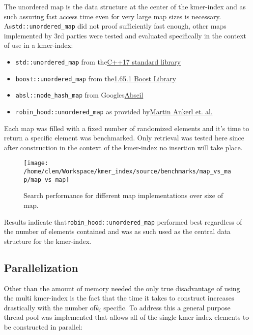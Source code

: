 The unordered map is the data structure at the center of the kmer-index
and as such assuring fast access time even for very large map sizes
is necessary. As\lstinline{std::unordered_map} did not proof sufficiently
fast enough, other maps implemented by 3rd parties were tested and
evaluated specifically in the context of use in a kmer-index:
\begin{itemize}
\item \lstinline{std::unordered_map} from the\href{https://en.cppreference.com/w/cpp/container/unordered_map}{C++17 standard library}
\item \lstinline{boost::unordered_map} from the\href{https://www.boost.org/doc/libs/1_65_0/doc/html/boost/unordered_map.html}{1.65.1 Boost Library}
\item \lstinline{absl::node_hash_map} from Googles\href{https://abseil.io/docs/cpp/guides/container\#abslnode_hash_map-and-abslnode_hash_set}{Abseil}
\item \lstinline{robin_hood::unordered_map} as provided by\href{https://github.com/martinus/robin-hood-hashing}{Martin Ankerl et. al.}
\end{itemize}
Each map was filled with a fixed number of randomized elements and
it's time to return a specific element was benchmarked. Only retrieval
was tested here since after construction in the context of the kmer-index
no insertion will take place.

\begin{figure}[H]
\texttt{[image: /home/clem/Workspace/kmer\_index/source/benchmarks/map\_vs\_map/map\_vs\_map]}

\caption{Search performance for different map implementations over size of
map.}
\end{figure}

Results indicate that\lstinline{robin_hood::unordered_map} performed
best regardless of the number of elements contained and was as such
used as the central data structure for the kmer-index.

\subsection{Parallelization}

Other than the amount of memory needed the only true disadvantage
of using the multi kmer-index is the fact that the time it takes to
construct increases drastically with the number of$k_{i}$ specific.
To address this a general purpose thread pool was implemented that
allows all of the single kmer-index elements to be constructed in
parallel:

